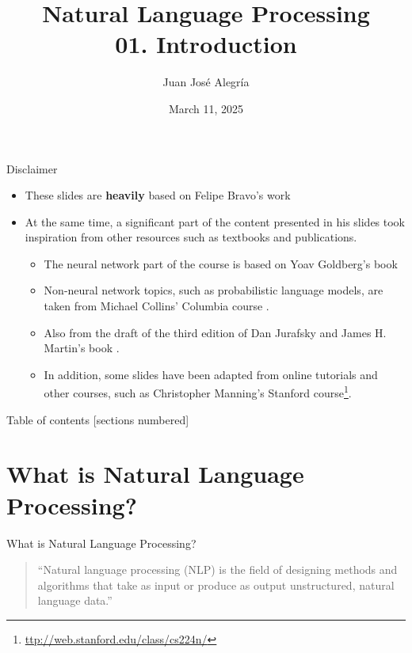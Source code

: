 \documentclass[10pt]{beamer}
\title{Natural Language Processing \\ 01. Introduction}
\author[Juan José Alegría]{Juan José Alegría}
\date{March 11, 2025}
\begin{document}
\begin{frame}
\titlepage


\end{frame}


\begin{frame}{Disclaimer}

\begin{itemize}
    \item These slides are \textbf{heavily} based on Felipe Bravo's work
    \item At the same time, a significant part of the content presented in his slides took inspiration from other resources such as textbooks and publications.  
    \begin{itemize}
    
    
        \item  The neural network part of the course is based on Yoav Goldberg's book \cite{goldberg2017neural}
        \item Non-neural network topics, such as probabilistic language models, are taken from Michael Collins' Columbia course \cite{collins2013language}.
        \item Also from the draft of the third edition of Dan Jurafsky and James H. Martin's book \cite{JurafskyBook}.
        \item In addition, some slides have been adapted from online tutorials and other courses, such as Christopher Manning's Stanford course\footnote{\url{ttp://web.stanford.edu/class/cs224n/}}. 
    \end{itemize}
\end{itemize}

\end{frame}

\begin{frame}{Table of contents}
  [sections numbered]
  \tableofcontents%
\end{frame}

\section{What is Natural Language Processing?}

\begin{frame}{What is Natural Language Processing?}
\begin{quote}
    ``Natural language processing (NLP) is the field of designing methods and algorithms that take as input or produce as output unstructured, natural language data.'' \\ \cite{goldberg2017neural}
\end{quote}
\end{frame}
\end{document}
